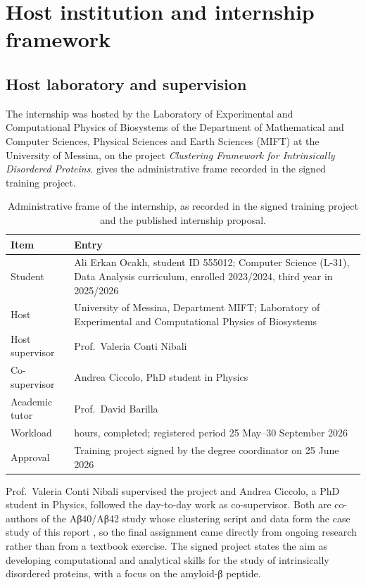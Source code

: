 \chapter{Host institution and internship framework}
\label{ch:host}
\section{Host laboratory and supervision}
The internship was hosted by the Laboratory of Experimental and Computational Physics of Biosystems of the Department of Mathematical and Computer Sciences, Physical Sciences and Earth Sciences (MIFT) at the University of Messina, on the project \emph{Clustering Framework for Intrinsically Disordered Proteins}.  gives the administrative frame recorded in the signed training project.

\begin{table}[htbp]
\centering
\caption{Administrative frame of the internship, as recorded in the signed training project and the published internship proposal.}
\label{tab:internshipframe}
\begin{tabularx}{\textwidth}{@{}>{\raggedright\arraybackslash}p{}>{\raggedright\arraybackslash}X@{}}
\toprule
Item & Entry\\
\midrule
Student & Ali Erkan Ocaklı, student ID 555012; Computer Science (L-31), Data Analysis curriculum, enrolled 2023/2024, third year in 2025/2026\\
Host & University of Messina, Department MIFT; Laboratory of Experimental and Computational Physics of Biosystems\\
Host supervisor & Prof.\ Valeria Conti Nibali\\
Co-supervisor & Andrea Ciccolo, PhD student in Physics\\
Academic tutor & Prof.\ David Barilla\\
Workload & 75 hours, completed; registered period 25 May--30 September 2026\\
Approval & Training project signed by the degree coordinator on 25 June 2026\\
\bottomrule
\end{tabularx}
\end{table}

Prof.\ Valeria Conti Nibali supervised the project and Andrea Ciccolo, a PhD student in Physics, followed the day-to-day work as co-supervisor. Both are co-authors of the Aβ40/Aβ42 study whose clustering script and data form the case study of this report \autocite{cadenelli2026}, so the final assignment came directly from ongoing research rather than from a textbook exercise. The signed project states the aim as developing computational and analytical skills for the study of intrinsically disordered proteins, with a focus on the amyloid-β peptide.

